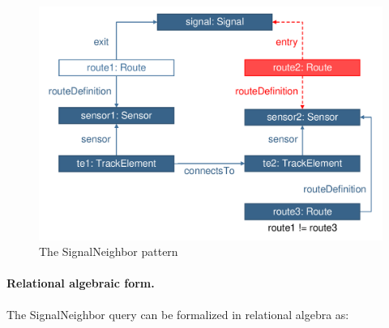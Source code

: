 % 
%   
%   
%   

\begin{figure}[Htb]
		\centering
		\includegraphics[scale=0.4]{figures/trainbenchmark-signalneighbor}
		\caption{The \textsf{SignalNeighbor} pattern}
		\label{fig:trainbenchmark-signalneighbor}
\end{figure}

\paragraph{Relational algebraic form.} The \textsf{SignalNeighbor} query can be formalized in relational algebra as:

